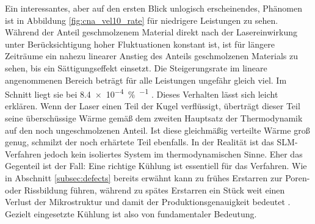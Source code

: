 		Ein interessantes, aber auf den ersten Blick unlogisch erscheinendes, Phänomen ist in
		Abbildung \ref{fig:cna_vel10_rate} für niedrigere Leistungen zu sehen. Während der Anteil
		geschmolzenem Material direkt nach der Lasereinwirkung unter Berücksichtigung hoher
		Fluktuationen konstant ist, ist für längere Zeiträume ein nahezu linearer Anstieg des
		Anteils geschmolzenen Materials zu sehen, bis ein Sättigungseffekt einsetzt. Die
		Steigerungsrate im lineare angenommenen Bereich beträgt für alle Leistungen ungefähr
		gleich viel. Im Schnitt liegt sie bei \SI{8.4e-4}{\percent\per\timeunit} . Dieses
		Verhalten lässt sich leicht erklären. Wenn der Laser einen Teil der Kugel verflüssigt,
		überträgt dieser Teil seine überschüssige Wärme gemäß dem zweiten Hauptsatz der
		Thermodynamik auf den noch ungeschmolzenen Anteil. Ist diese gleichmäßig verteilte Wärme
		groß genug, schmilzt der noch erhärtete Teil ebenfalls. In der Realität ist das
		SLM-Verfahren jedoch kein isoliertes System im thermodynamischen Sinne. Eher das Gegenteil
		ist der Fall: Eine richtige Kühlung ist essentiell für das Verfahren. Wie in Abschnitt
		\ref{subsec:defects} bereits erwähnt kann zu frühes Erstarren zur Poren- oder Rissbildung
		führen, während zu spätes Erstarren ein Stück weit einen Verlust der Mikrostruktur und
		damit der Produktionsgenauigkeit bedeutet \cite{sercombe2016selective}. Gezielt
		eingesetzte Kühlung ist also von fundamentaler Bedeutung.

